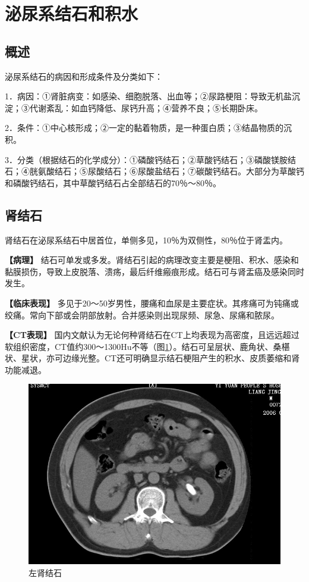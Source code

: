 \section{泌尿系结石和积水}

\subsection{概述}

泌尿系结石的病因和形成条件及分类如下：

1．病因：①肾脏病变：如感染、细胞脱落、出血等；②尿路梗阻：导致无机盐沉淀；③代谢紊乱：如血钙降低、尿钙升高；④营养不良；⑤长期卧床。

2．条件：①中心核形成；②一定的黏着物质，是一种蛋白质；③结晶物质的沉积。

3．分类（根据结石的化学成分）：①磷酸钙结石；②草酸钙结石；③磷酸镁胺结石；④胱氨酸结石；⑤尿酸结石；⑥尿酸盐结石；⑦碳酸钙结石。大部分为草酸钙和磷酸钙结石，其中草酸钙结石占全部结石的70％～80％。

\subsection{肾结石}

肾结石在泌尿系结石中居首位，单侧多见，10％为双侧性，80％位于肾盂内。

\textbf{【病理】}
结石可单发或多发。肾结石引起的病理改变主要是梗阻、积水、感染和黏膜损伤，导致上皮脱落、溃疡，最后纤维瘢痕形成。结石可与肾盂癌及感染同时发生。

\textbf{【临床表现】}
多见于20～50岁男性，腰痛和血尿是主要症状。其疼痛可为钝痛或绞痛。常向下部或会阴部放射。合并感染则出现尿频、尿急、尿痛和脓尿。

\textbf{【CT表现】}
国内文献认为无论何种肾结石在CT上均表现为高密度，且远远超过软组织密度，CT值约300～1300Hu不等（图\ref{fig15-8}）。结石可呈层状、鹿角状、桑椹状、星状，亦可边缘光整。CT还可明确显示结石梗阻产生的积水、皮质萎缩和肾功能减退。

\begin{figure}[!htbp]
 \centering
 \includegraphics[width=.7\textwidth,height=\textheight,keepaspectratio]{./images/Image00323.jpg}
 \captionsetup{justification=centering}
 \caption{左肾结石}
 \label{fig15-8}
  \end{figure} 

